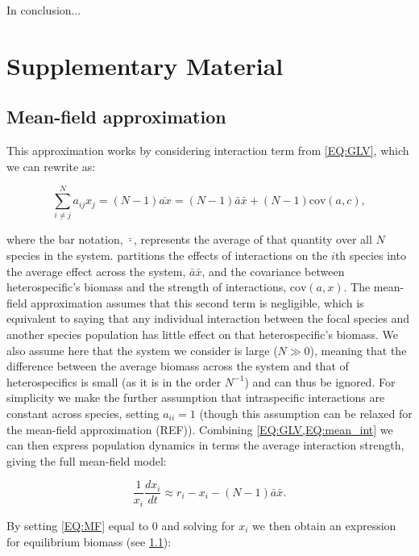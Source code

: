 \documentclass{article}
\begin{document}
In conclusion...





\newpage
\section{Supplementary Material}

\subsection{Mean-field approximation} \label{SI_Sec:Meanfield}

This approximation works by considering interaction term from \cref{EQ:GLV}, which we can rewrite as:

\begin{equation} \label{EQ:mean_int} 
    \sum^N_{i \neq j} a_{ij} x_j = (N-1) \bar{a x} = (N-1) \bar{a} \bar{x} + (N-1) \text{cov}(a,c),
\end{equation}

where the bar notation, $\bar{\cdot}$, represents the average of that quantity over all $N$ species in the system.  partitions the effects of interactions on the $i$th species into the average effect across the system, $\bar{a} \bar{x}$, and the covariance between heterospecific's biomass and the strength of interactions, $\text{cov}(a,x)$. The mean-field approximation assumes that this second term is negligible, which is equivalent to saying that any individual interaction between the focal species and another species population has little effect on that heterospecific's biomass. We also assume here that the system we consider is large ($N \gg 0$), meaning that the difference between the average biomass across the system and that of heterospecifics is small (as it is in the order $N^{-1}$) and can thus be ignored. For simplicity we make the further assumption that intraspecific interactions are constant across species, setting $a_{ii} = 1$ (though this assumption can be relaxed for the mean-field approximation (REF)). Combining \cref{EQ:GLV,EQ:mean_int} we can then express population dynamics in terms the average interaction strength, giving the full mean-field model:

\begin{equation} \label{EQ:MF}
    \frac{1}{x_i} \frac{dx_i}{dt} \approx r_i - x_i - (N-1)\bar{a}\bar{x}.
\end{equation}

By setting \cref{EQ:MF} equal to $0$ and solving for $x_i$ we then obtain an expression for equilibrium biomass (see \cref{SI_Sec:Meanfield}):
\end{document}
